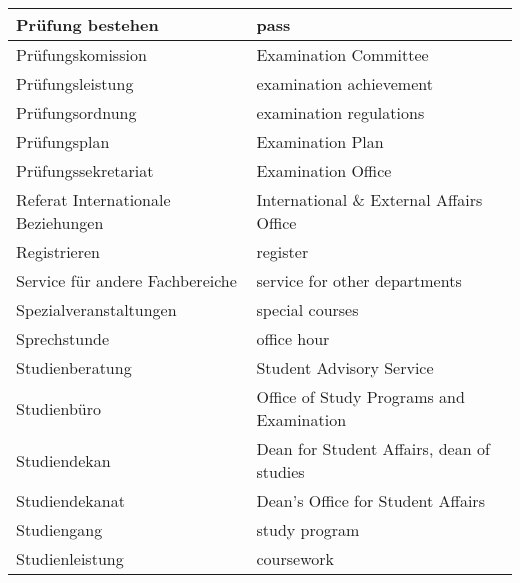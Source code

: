 \begin{longtable} {|p{.5\linewidth}|p{.5\linewidth}|}
    \hline
    Prüfung bestehen                    & pass                                                           \\
    \hline
    Prüfungskomission                   & Examination Committee                                          \\
    \hline
    Prüfungsleistung                    & examination achievement                                        \\
    \hline
    Prüfungsordnung                     & examination regulations                                        \\
    \hline
    Prüfungsplan                        & Examination Plan                                               \\
    \hline
    Prüfungssekretariat                 & Examination Office                                             \\
    \hline
    Referat Internationale Beziehungen  & International \& External Affairs Office                       \\
    \hline
    Registrieren                        & register                                                       \\
    \hline
    Service für andere Fachbereiche     & service for other departments                                  \\
    \hline
    Spezialveranstaltungen              & special courses                                                \\
    \hline
    Sprechstunde                        & office hour                                                    \\
    \hline
    Studienberatung                     & Student Advisory Service                                       \\
    \hline
    Studienbüro                         & Office of Study Programs and Examination                       \\
    \hline
    Studiendekan                        & Dean for Student Affairs, dean of studies                      \\
    \hline
    Studiendekanat                      & Dean's Office for Student Affairs                              \\
    \hline
    Studiengang                         & study program                                                  \\
    \hline
    Studienleistung                     & coursework                                                     \\

\end{longtable}

